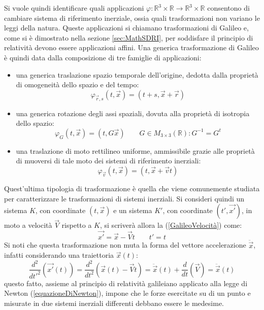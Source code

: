 Si vuole quindi identificare quali applicazioni $\varphi:\mathbb{R}^3\times\mathbb{R}\rightarrow
\mathbb{R}^3\times\mathbb{R}$ consentono di cambiare sistema di riferimento inerziale, ossia quali 
trasformazioni non variano le leggi della natura. Queste applicazioni si chiamano trasformazioni di 
Galileo e, come si è dimostrato nella sezione \ref{sec:MathSDRI}, per soddisfare il principio di relatività devono essere applicazioni affini.
Una generica trasformazione di Galileo è quindi data dalla composizione di tre famiglie di applicazioni:
\begin{itemize}
	\item una generica traslazione spazio temporale dell'origine, dedotta dalla proprietà 
	di omogeneità dello spazio e del tempo:
	\begin{equation}
		\varphi_{\vec{r},s}(t,\vec{x})=(t+s,\vec{x}+\vec{r})
		\label{GalileoTraslazoine}
	\end{equation} 
\item una generica rotazione degli assi spaziali, dovuta alla proprietà di isotropia dello spazio:
\begin{equation}
	\varphi_{G}(t,\vec{x})=(t,G\vec{x}) \qquad G\in M_{3\times3}(\mathbb{R}):G^{-1}=G^t
	\label{GalileoRotazione}
\end{equation} 
	\item una traslazione di moto rettilineo uniforme, ammissibile grazie alle proprietà di muoversi di tale moto dei sistemi 
	di riferimento inerziali:
\begin{equation}
	\varphi_{\vec{v}}(t,\vec{x})=(t,\vec{x}+\vec{v}t)
	\label{GalileoVelocità}
\end{equation} 
\end{itemize}
Quest'ultima tipologia di trasformazione è quella che viene comunemente studiata per caratterizzare le trasformazioni di sistemi inerziali. 
Si consideri quindi un sistema $K$, con coordinate $(t,\vec{x})$ e un sistema $K'$, con 
coordinate $(t',\vec{x'})$, in moto a velocità $\vec{V}$ rispetto a $K$, si scriverà allora la 
(\ref{GalileoVelocità}) come:
\begin{equation}
	\vec{x'}=\vec{x}-\vec{V}t \qquad t'=t
	\label{GalileoEasy}
\end{equation}
Si noti che questa trasformazione non muta la forma del vettore accelerazione $\ddot{\vec{x}}$, infatti considerando una traiettoria $\vec{x}(t)$:
\begin{equation*}
	\frac{d^2}{dt'^2}(\vec{x'}(t))=\frac{d^2}{dt^2}(\vec{x}(t)-\vec{V}t)=\ddot{\vec{x}}(t)+\frac{d}{dt}(\vec{V})=\ddot{\vec{x}}(t)
\end{equation*} 
questo fatto, assieme al principio di relatività galileiano applicato alla legge di Newton (\ref{equazioneDiNewton}), 
impone che le forze esercitate su di un punto e misurate in due sistemi inerziali differenti debbano essere le medesime. \\

